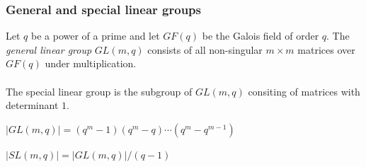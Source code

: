 \documentclass{beamer}
\begin{document}
\begin{frame}
	\frametitle{General and special linear groups}
		\begin{definition} Let $q$ be a power of a prime and let $GF(q)$ be the Galois field of order $q$. The {\em general linear group} $GL(m,q)$ consists of all non-singular $m\times m$ matrices over $GF(q)$ under multiplication. \\~\\
		The special linear group is the subgroup of $GL(m,q)$ consiting of matrices with determinant $1$.
		\end{definition}
		\begin{theorem}[Order of $GL(m,q)$]
			$|GL(m,q)| = (q^m - 1)(q^m - q) \cdots (q^m - q^{m-1})$
		\end{theorem}
		\begin{theorem}[Order of $SL(m,q)$]
			$|SL(m,q)| = |GL(m,q)|/(q-1)$
		\end{theorem}
\end{frame}
\end{document}
